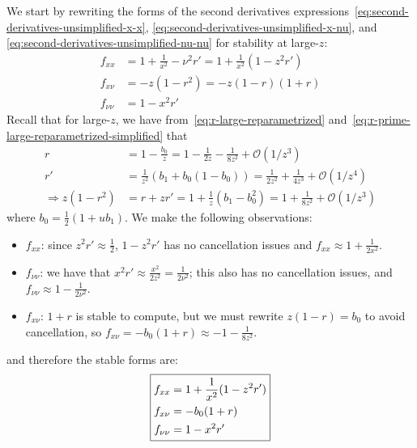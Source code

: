 \documentclass{article}
\begin{document}
We start by rewriting the forms of the second derivatives expressions~\eqref{eq:second-derivatives-unsimplified-x-x}, \eqref{eq:second-derivatives-unsimplified-x-nu}, and \eqref{eq:second-derivatives-unsimplified-nu-nu} for stability at large-$z$:
%
\begin{align}
  f_{xx}     & = 1 + \frac{1}{x^2} - \nu^2 r' = 1 + \frac{1}{x^2}(1 - z^2 r') \\
  f_{x\nu}   & = -z(1 - r^2) = -z (1 - r) (1 + r)                             \\
  f_{\nu\nu} & = 1 - x^2 r'
\end{align}
%
Recall that for large-$z$, we have from~\eqref{eq:r-large-reparametrized} and~\eqref{eq:r-prime-large-reparametrized-simplified} that
\begin{align}
  r                      & = 1 - \frac{b_0}{z} = 1 - \frac{1}{2z} - \frac{1}{8z^2} + \mathcal{O}(1/z^3)                \\
  r'                     & = \frac{1}{z^2} (b_1 + b_0(1 - b_0)) = \frac{1}{2z^2} + \frac{1}{4z^3} + \mathcal{O}(1/z^4) \\
  \Rightarrow z(1 - r^2) & = r + z r' = 1 + \frac{1}{z} (b_1 - b_0^2) = 1 + \frac{1}{8z^2} + \mathcal{O}(1/z^3)
\end{align}
where $b_0 = \frac{1}{2} (1 + u b_1)$.
%
We make the following observations:
%
\begin{itemize}
  \item $f_{xx}$: since $z^2 r' \approx \frac{1}{2}$, $1 - z^2 r'$ has no cancellation issues and $f_{xx} \approx 1 + \frac{1}{2x^2}$.
  \item $f_{\nu\nu}$: we have that $x^2 r' \approx \frac{x^2}{2z^2} = \frac{1}{2\nu^2}$; this also has no cancellation issues, and $f_{\nu\nu} \approx 1 - \frac{1}{2\nu^2}$.
  \item $f_{x\nu}$: $1 + r$ is stable to compute, but we must rewrite $z(1 - r) = b_0$ to avoid cancellation, so $f_{x\nu} = -b_0(1 + r) \approx -1 - \frac{1}{8z^2}$.
\end{itemize}
%
and therefore the stable forms are:
%
\begin{align}\label{eq:second-derivatives-large-z}
  \boxed{%
    \begin{aligned}
      f_{xx}     & = 1 + \frac{1}{x^2}(1 - z^2 r') \\
      f_{x\nu}   & = -b_0 (1 + r)                  \\
      f_{\nu\nu} & = 1 - x^2 r'
    \end{aligned}}
\end{align}
\end{document}
